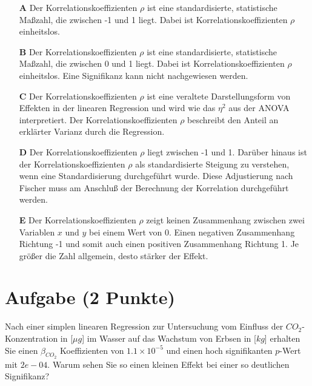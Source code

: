 \documentclass[a4paper, 9pt]{scrartcl}\usepackage[]{graphicx}\usepackage[]{xcolor}
\begin{document}
\begin{enumerate}
\item [\textbf{A} \msquare] Der Korrelationskoeffizienten $\rho$ ist eine standardisierte, statistische Maßzahl, die zwischen -1 und 1 liegt. Dabei ist Korrelationskoeffizienten $\rho$ einheitslos.
\item [\textbf{B} \msquare] Der Korrelationskoeffizienten $\rho$ ist eine standardisierte, statistische Maßzahl, die zwischen 0 und 1 liegt. Dabei ist Korrelationskoeffizienten $\rho$ einheitslos. Eine Signifikanz kann nicht nachgewiesen werden.
\item [\textbf{C} \msquare] Der Korrelationskoeffizienten $\rho$ ist eine veraltete Darstellungsform von Effekten in der linearen Regression und wird wie das $\eta^2$ aus der ANOVA interpretiert. Der Korrelationskoeffizienten $\rho$ beschreibt den Anteil an erklärter Varianz durch die Regression.
\item [\textbf{D} \msquare] Der Korrelationskoeffizienten $\rho$ liegt zwischen -1 und 1. Darüber hinaus ist der Korrelationskoeffizienten $\rho$ als standardisierte Steigung zu verstehen, wenn eine Standardisierung durchgeführt wurde. Diese Adjustierung nach Fischer muss am Anschluß der Berechnung der Korrelation durchgeführt werden.
\item [\textbf{E} \msquare] Der Korrelationskoeffizienten $\rho$ zeigt keinen Zusammenhang zwischen zwei Variablen $x$ und $y$ bei einem Wert von 0. Einen negativen Zusammenhang Richtung -1 und somit auch einen positiven Zusammenhang Richtung 1. Je größer die Zahl allgemein, desto stärker der Effekt.
\end{enumerate}

\section{Aufgabe \hfill (2 Punkte)}



Nach einer simplen linearen Regression zur Untersuchung vom Einfluss der $CO_2$-Konzentration in [$\mu g$] im Wasser auf das Wachstum von Erbsen in [$kg$] erhalten Sie einen $\beta_{CO_2}$ Koeffizienten von $1.1\times 10^{-5}$ und einen hoch signifikanten $p$-Wert mit $2e-04$. Warum sehen Sie so einen kleinen Effekt bei einer so deutlichen Signifikanz?
\end{document}
